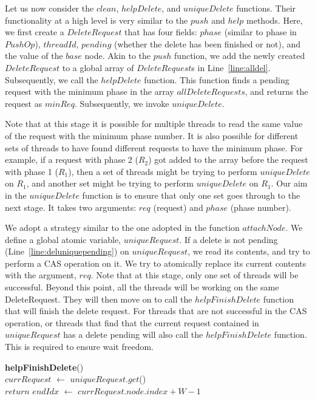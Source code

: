 \documentclass{llncs}
\begin{document}
\begin{appendix}
\normalsize
Let us now consider the $clean$, $helpDelete$, and $uniqueDelete$ functions. Their functionality at a high level
is very similar to the $push$ and $help$ methods.  Here, we first create a $DeleteRequest$
that has four fields: $phase$ (similar to phase in $PushOp$), $threadId$, $pending$ (whether the delete
has been finished or not), and  the value of the $base$ node. Akin to the $push$ function,
we add the newly created $DeleteRequest$ to a global array of $DeleteRequest$s in Line~\ref{line:alldel}.
Subsequently, we call the $helpDelete$ function. This function finds a pending request with the minimum phase
in the array $allDeleteRequests$, and returns the request as $minReq$. Subsequently, we invoke $uniqueDelete$.

Note that at this stage it is possible for multiple threads to read the same value of the request with the 
minimum phase number. It is also possible for different sets of threads to have found different requests
to have the minimum phase. For example, if a request with phase 2 ($R_2$) got added to the array before the request with
phase 1 ($R_1$), then a set of threads might be trying to perform $uniqueDelete$ on $R_1$, and another set might
be trying to perform $uniqueDelete$ on $R_1$. Our aim in the $uniqueDelete$ function is to ensure that only
one set goes through to the next stage. It takes two arguments: $req$ (request) and $phase$ (phase number).

We adopt a strategy similar to the one adopted in the function $attachNode$. We define a global atomic
variable, $uniqueRequest$. If a delete is not pending (Line~\ref{line:deluniquepending}) 
on $uniqueRequest$, we read its contents, and try to perform a CAS operation on it. We try to atomically
replace its current contents with the argument, $req$. Note that at this stage, only one set of threads
will be successful. Beyond this point, all the threads will be working on the same DeleteRequest. 
They will then move on to call the $helpFinishDelete$ function that will finish the delete request. 
For threads that are not successful in the CAS operation, or threads that find that the current request
contained in $uniqueRequest$ has a delete pending will also call the $helpFinishDelete$ function. This 
is required to ensure wait freedom. 


\begin{algorithm}
\small
\SetAlgoLined
\textbf{helpFinishDelete}(){}\\
		$currRequest$ $\leftarrow$ $uniqueRequest.get$() \label{line:currreada} \\
		{
			$return$
		}
\vskip 2mm
			$endIdx$ $\leftarrow$ $currRequest.node.index + W - 1$	 \label{line:endidxa}\\


\end{algorithm}
\end{appendix}
\end{document}
